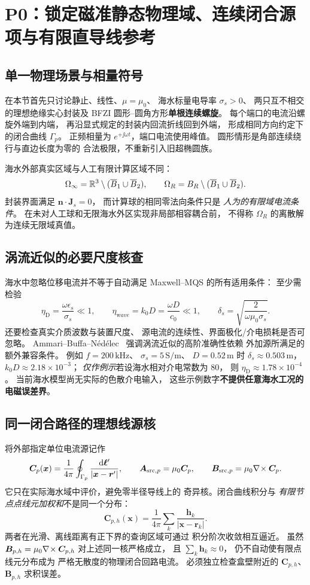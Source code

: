 \section{P0：锁定磁准静态物理域、连续闭合源项与有限直导线参考}
\label{sec:p0-physical-source}

\subsection{单一物理场景与相量符号}
在本节首先只讨论静止、线性、$\mu=\mu_0$、
海水标量电导率 $\sigma_s>0$、
两只互不相交的理想绝缘实心封装及
BFZI 圆形--圆角方形\textbf{单根连续螺旋}。
每个端口的电流沿螺旋外端到内端，
再沿显式规定的封装内回流折线回到外端，
形成相同方向约定下的闭合曲线 $\Gamma_p$。
正频相量为 $e^{+\jj\omega t}$，端口电流使用峰值。
圆形情形是角部连续绕行与直边长度为零的
合法极限，不重新引入旧超椭圆族。

海水外部真实区域与人工有限计算区域不同：
\[
\Omega_\infty=\mathbb R^3\setminus(\overline B_1\cup\overline B_2),
\qquad
\Omega_R=B_R\setminus(\overline B_1\cup\overline B_2).
\]
封装界面满足 $\bm n\cdot\bm J_s=0$，
而计算球的相同零法向条件只是
\emph{人为的有限域电流条件}。
在未对人工球和无限海水外区实现非局部相容耦合前，
不得称 $\Omega_R$ 的离散解为连续无限域真值。

\subsection{涡流近似的必要尺度核查}
海水中忽略位移电流并不等于自动满足
Maxwell--MQS 的所有适用条件：
至少需检验
\[
\eta_{\mathrm D}
=\frac{\omega\epsilon_s}{\sigma_s}\ll1,
\qquad
\eta_{\mathrm wave}
=k_0D=\frac{\omega D}{c_0}\ll1,
\qquad
\delta_s=\sqrt{\frac{2}{\omega\mu_0\sigma_s}} .
\]
还要检查真实介质波数与装置尺度、
源电流的连续性、界面极化/介电损耗是否可忽略。
Ammari--Buffa--N\'ed\'elec~\cite{ammaribuffanedelec2000}
强调涡流近似的高阶准确性依赖
外加源所满足的额外兼容条件。
例如 $f=200\,\mathrm{kHz}$、
$\sigma_s=5\,\mathrm{S/m}$、
$D=0.52\,\mathrm m$ 时
$\delta_s\approx0.503\,\mathrm m$，
$k_0D\approx2.18\times10^{-3}$；
\emph{仅作例示}若设海水相对介电常数为 $80$，
则 $\eta_{\mathrm D}\approx1.78\times10^{-4}$。
当前海水模型尚无实际的色散介电输入，
这些示例数字\textbf{不提供任意海水工况的电磁误差界}。

\subsection{同一闭合路径的理想线源核}
将外部指定单位电流源记作
\[
\bm C_p(\bm x)=\frac1{4\pi}
\oint_{\Gamma_p}\frac{\mathrm d\bm\ell'}{|\bm x-\bm r'|},
\qquad
\bm A_{\mathrm{src},p}=\mu_0\bm C_p,\qquad
\bm B_{\mathrm{src},p}=\mu_0\nabla\!\times\bm C_p .
\]
它只在实际海水域中评价，避免零半径导线上的
奇异核。闭合曲线积分与
\emph{有限节点点线元加权和}不是同一个分布：
\[
\bm C_{p,h}(\bm x)=\frac1{4\pi}
\sum_k\frac{\bm h_k}{|\bm x-\bm r_k|}.
\]
两者在光滑、离线距离有正下界的查询区域可通过
积分阶次收敛相互逼近。
虽然 $\bm B_{p,h}=\mu_0\nabla\!\times\bm C_{p,h}$
对上述同一核严格成立，
且 $\sum_k\bm h_k\approx0$，
仍不自动使有限点线元分布成为
严格无散度的物理闭合回路电流。
必须独立检查盒壁附近的
$\bm C_{p,h}$、$\bm B_{p,h}$ 求积误差。

